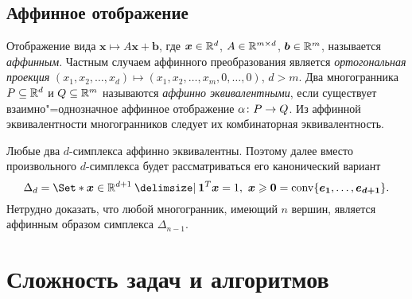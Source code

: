 \subsection{Аффинное отображение}

Отображение вида $\bm{x} \mapsto A \bm{x} + \bm{b}$, 
где $\bm{x} \in \mathbb{R}^d$, $A \in \mathbb{R}^{m\times d}$, $\bm{b} \in \mathbb{R}^m$, называется \emph{аффинным}. 
Частным случаем аффинного преобразования является \emph{ортогональная проекция} $(x_1, x_2, \dots, x_d) \mapsto (x_1, x_2, \dots, x_m, 0, \dots, 0)$, $d > m$.
Два многогранника $P\subseteq \mathbb{R}^d$ и $Q\subseteq \mathbb{R}^m$ называются \emph{аффинно эквивалентными},
если существует взаимно"=однозначное аффинное отображение $\alpha\colon P \to Q$.
Из аффинной эквивалентности многогранников следует их комбинаторная эквивалентность.

Любые два $d$-симплекса аффинно эквивалентны.
Поэтому далее вместо произвольного $d$-симплекса будет рассматриваться его канонический вариант
\[
\Delta_d = \Set*{\bm{x} \in \R^{d+1} \given \bm{1}^T \bm{x} = 1, \ \bm{x} \ge \bm{0}}
= \conv\{\bm{e_1}, \dots, \bm{e_{d+1}}\}.
\]\label{ProjOfSimplex}
Нетрудно доказать, что любой многогранник, имеющий $n$ вершин, является аффинным образом симплекса $\Delta_{n-1}$.

\begin{comment}
\emph{Проективным преобразованием} называется дробно"=линейное отображение вида
\[
\tau(\bm{x}) = \frac{\alpha(\bm{x})}{\bm{a}^T \bm{x} + b},
\]
где $\alpha$ "--- аффинное отображение, размерности векторов $\bm{a}$ и $\bm{x}$ одинаковы, $b\in \R$.

Проективные преобразования обладают следующими свойствами~\cite{ZieglerBook}:
\begin{enumerate}
\item Пусть $P$ и $Q$ "--- многогранники. Если проективное преобразование $\tau \from P \to Q$ взаимно"=однозначно,	то многогранники $P$ и $Q$ комбинаторно эквивалентны.
\item Пусть многогранник $Q$ является аффинным образом некоторой грани многогранника $P$. Тогда существует проективное преобразование $\tau \from P \to Q$.
\end{enumerate}
\end{comment}
 


\section{Сложность задач и алгоритмов}
\label{sec:complexity}

